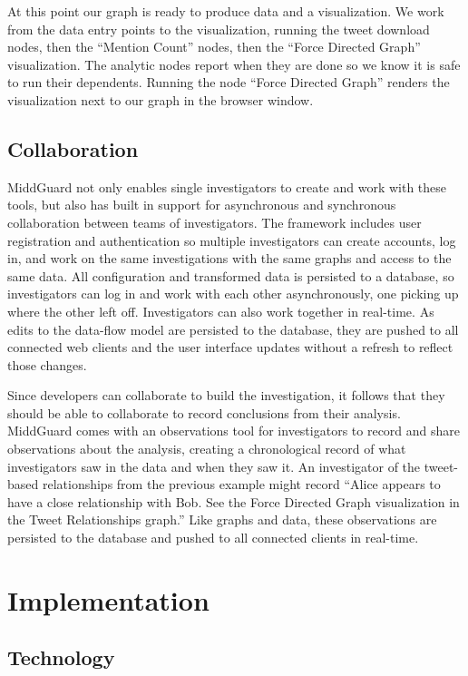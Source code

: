 \documentclass[midd]{thesis}
\begin{document}
At this point our graph is ready to produce data and a visualization. We work
from the data entry points to the visualization, running the tweet download
nodes, then the ``Mention Count'' nodes, then the ``Force Directed Graph''
visualization. The analytic nodes report when they are done so we know it is
safe to run their dependents. Running the node ``Force Directed Graph'' renders
the visualization next to our graph in the browser window.

\section{Collaboration}

MiddGuard not only enables single investigators to create and work with these
tools, but also has built in support for asynchronous and synchronous
collaboration between teams of investigators. The framework includes user
registration and authentication so multiple investigators can create accounts,
log in, and work on the same investigations with the same graphs and access to
the same data. All configuration and transformed data is persisted to a
database, so investigators can log in and work with each other asynchronously,
one picking up where the other left off. Investigators can also work together in
real-time. As edits to the data-flow model are persisted to the database, they
are pushed to all connected web clients and the user interface updates without a
refresh to reflect those changes.

Since developers can collaborate to build the investigation, it follows that
they should be able to collaborate to record conclusions from their analysis.
MiddGuard comes with an observations tool for investigators to record and share
observations about the analysis, creating a chronological record of what
investigators saw in the data and when they saw it. An investigator of the
tweet-based relationships from the previous example might record ``Alice appears
to have a close relationship with Bob. See the Force Directed Graph
visualization in the Tweet Relationships graph.'' Like graphs and data, these
observations are persisted to the database and pushed to all connected clients
in real-time.

\chapter{Implementation}

\section{Technology}
\end{document}
